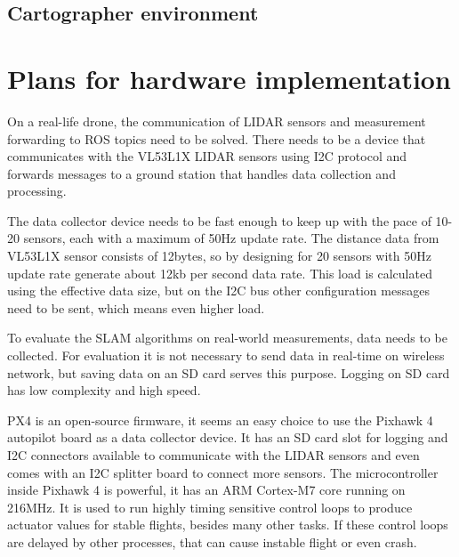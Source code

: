 \subsection{Cartographer environment} \label{sect:cartographer_environment}











\section{Plans for hardware implementation}
On a real-life drone, the communication of LIDAR sensors and measurement forwarding to ROS topics need
to be solved. There needs to be a device that communicates with the VL53L1X LIDAR sensors using I2C
protocol and forwards messages to a ground station that handles data collection and processing.

The data collector device needs to be fast enough to keep up with the pace of 10-20 sensors,
each with a maximum of 50Hz update rate. The distance data from VL53L1X sensor consists of 12bytes, 
so by designing for 20 sensors with 50Hz update rate generate about 12kb per second data rate. This 
load is calculated using the effective data size, but on the I2C bus other configuration messages 
need to be sent, which means even higher load.

To evaluate the SLAM algorithms on real-world measurements, data needs to be collected. 
For evaluation it is not necessary to send data in real-time on wireless network, but saving 
data on an SD card serves this purpose. Logging on SD card has low complexity and high speed. 

PX4 is an open-source firmware, it seems an easy choice to use the Pixhawk 4 autopilot board 
as a data collector device. It has an SD card slot for logging and I2C connectors available to
communicate with the LIDAR sensors and even comes with an I2C splitter board to connect more sensors.
The microcontroller inside Pixhawk 4 is powerful, it has an ARM Cortex-M7 core running on 216MHz. 
It is used to run highly timing sensitive control loops to produce actuator values for stable flights,
besides many other tasks. If these control loops are delayed by other processes, that can 
cause instable flight or even crash.

